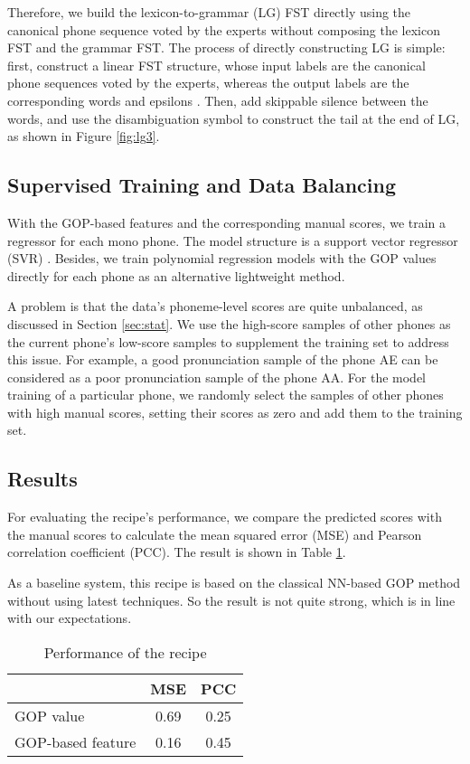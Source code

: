 \documentclass[a4paper]{article}
\begin{document}
Therefore, we build the lexicon-to-grammar (LG) FST directly using the canonical phone sequence voted by the experts without composing the lexicon FST and the grammar FST. The process of directly constructing LG is simple: first, construct a linear FST structure, whose input labels are the canonical phone sequences voted by the experts, whereas the output labels are the corresponding words and epsilons \cite{mohri2008speech}. Then, add skippable silence between the words, and use the disambiguation symbol to construct the tail at the end of LG, as shown in Figure \ref{fig:lg3}.

\subsection{Supervised Training and Data Balancing}

With the GOP-based features and the corresponding manual scores, we train a regressor for each mono phone. The model structure is a support vector regressor (SVR) \cite{drucker1997support}.
Besides, we train polynomial regression models with the GOP values directly for each phone as an alternative lightweight method.

A problem is that the data's phoneme-level scores are quite unbalanced, as discussed in Section \ref{sec:stat}.
We use the high-score samples of other phones as the current phone's low-score samples to supplement the training set to address this issue. 
For example, a good pronunciation sample of the phone AE can be considered as a poor pronunciation sample of the phone AA. For the model training of a particular phone, we randomly select the samples of other phones with high manual scores, setting their scores as zero and add them to the training set.

\subsection{Results}

For evaluating the recipe's performance, we compare the predicted scores with the manual scores to calculate the mean squared error (MSE) and Pearson correlation coefficient (PCC). The result is shown in Table \ref{tab:result}.

As a baseline system, this recipe is based on the classical NN-based GOP method without using latest techniques.
So the result is not quite strong, which is in line with our expectations. 

\begin{table}[t]
  \caption{Performance of the recipe}
  \label{tab:result}
  \centering
  \begin{tabular}{lcc}
    \toprule
    \textbf{          }                          & \textbf{MSE}   & \textbf{PCC}  \\
    \midrule
    GOP value                                    &    0.69        &    0.25       \\
    GOP-based feature                            &    0.16        &    0.45       \\
    \bottomrule
  \end{tabular}
\end{table}
\end{document}
